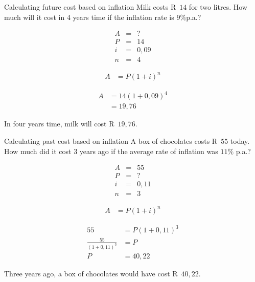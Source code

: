 \begin{wex}{Calculating future cost based on inflation}
    {Milk costs R~$14$ for two litres. How much will it cost in 4 years time if the inflation rate is $9\%$p.a.?}{
    
    \begin{eqnarray*}
	A &=& ?\\
	P &=& 14\\
	i &=& 0,09\\
	n &=& 4
    \end{eqnarray*}

    \begin{align*}
	A &= P(1 + i)^n
    \end{align*}

    \begin{align*}
	A &= 14(1 + 0,09)^4\\
	  &= 19,76
    \end{align*}

    In four years time, milk will cost R~$19,76$.
    }
\end{wex}


\begin{wex}{Calculating past cost based on inflation}
    {A box of chocolates costs R~$55$ today. How much did it cost 3 years ago if the average rate of inflation was $11\%$ p.a.?}{
    
    \begin{eqnarray*}
	A &=& 55\\
	P &=& ?\\
	i &=& 0,11\\
	n &=& 3
    \end{eqnarray*}

    \begin{align*}
	A &= P(1 + i)^n
    \end{align*}

    \begin{align*}
	55 &= P(1 + 0,11)^3\\
	\frac{55}{(1 + 0,11)^3} &= P\\
	P  &= 40,22
    \end{align*}

    Three years ago, a box of chocolates would have cost R~$40,22$.
    }
\end{wex}


